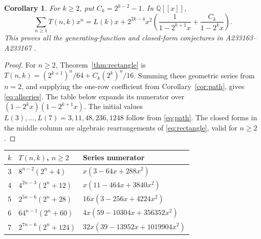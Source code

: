 \documentclass[11pt]{article}
\newtheorem{corollary}[theorem]{Corollary}
\begin{document}
\begin{corollary}\label{cor:allseries}
For $k\geq2$, put $C_k=2^{k-2}-1$. In $\mathbb Q[[x]]$,
\begin{equation}\label{eq:allseries}
 \sum_{n\geq1}T(n,k)x^n
 =L(k)x+2^{2k-4}x^2\left(
 \frac{1}{1-2^{k+1}x}+\frac{C_k}{1-2^kx}\right).
\end{equation}
This proves all the generating-function and closed-form conjectures
in A233163--A233167 \cite{barker-source,siblings}.
\end{corollary}
\begin{proof}
For $n\geq2$, Theorem~\ref{thm:rectangle} is
$T(n,k)=(2^{k+1})^n/64+C_k(2^k)^n/16$.
Summing these geometric series from $n=2$, and supplying the one-row
coefficient from Corollary~\ref{cor:path}, gives \eqref{eq:allseries}.
The table below expands its numerator over
$(1-2^kx)(1-2^{k+1}x)$. The initial values
$L(3),\ldots,L(7)=3,11,48,236,1248$ follow from \eqref{eq:path}.
The closed forms in the middle column are algebraic rearrangements of
\eqref{eq:rectangle}, valid for $n\geq2$.
\end{proof}
\begin{center}
\small
\begin{tabular}{@{}cll@{}}
\toprule
$k$ & $T(n,k)$, $n\geq2$ & Series numerator\\
\midrule
3 & $8^{n-2}(2^n+4)$ & $x(3-64x+288x^2)$\\
4 & $4^{2n-3}(2^n+12)$ & $x(11-464x+3840x^2)$\\
5 & $2^{5n-6}(2^n+28)$ & $16x(3-256x+4224x^2)$\\
6 & $64^{n-1}(2^n+60)$ & $4x(59-10304x+356352x^2)$\\
7 & $2^{7n-6}(2^n+124)$ & $32x(39-13952x+1019904x^2)$\\
\bottomrule
\end{tabular}
\end{center}
\end{document}
